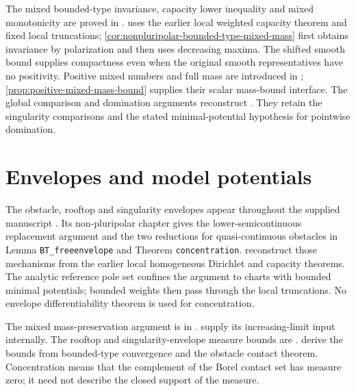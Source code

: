 The mixed bounded-type invariance, capacity lower inequality and mixed monotonicity are proved in \cite[Proposition 2.1, Theorem 2.3 and Theorem 2.4, pp.~2054--2057]{DDNL18mono}.  uses the earlier local weighted capacity theorem and fixed local truncations; \cref{cor:nonpluripolar-bounded-type-mixed-mass} first obtains invariance by polarization and then uses decreasing maxima. The shifted smooth bound supplies compactness even when the original smooth representatives have no positivity. Positive mixed numbers and full mass are introduced in \cite[Definition 1.17, Proposition 1.20 and Definition 1.21, pp.~218--222]{BEGZ10}; \cref{prop:positive-mixed-mass-bound} supplies their scalar mass-bound interface. The global comparison and domination arguments reconstruct \cite[Corollaries 4.1--4.2, pp.~8--9]{WittNystrom2017v1}. They retain the singularity comparisons and the stated minimal-potential hypothesis for pointwise domination.

\section{Envelopes and model potentials}\label{sec:history-envelopes}
The obstacle, rooftop and singularity envelopes appear throughout the supplied manuscript \cite{XiaSampleBook}. Its non-pluripolar chapter gives the lower-semicontinuous replacement argument and the two reductions for quasi-continuous obstacles in Lemma \texttt{BT\_freeenvelope} and Theorem \texttt{concentration}.  reconstruct those mechanisms from the earlier local homogeneous Dirichlet and capacity theorems. The analytic reference pole set confines the argument to charts with bounded minimal potentials; bounded weights then pass through the local truncations. No envelope differentiability theorem is used for concentration.

The mixed mass-preservation argument is in \cite[Section 3B, p.~2060]{DDNL18mono}.  supply its increasing-limit input internally. The rooftop and singularity-envelope measure bounds are \cite[Lemma 3.7 and Theorem 3.8, pp.~2060--2061]{DDNL18mono}.  derive the bounds from bounded-type convergence and the obstacle contact theorem. Concentration means that the complement of the Borel contact set has measure zero; it need not describe the closed support of the measure.

